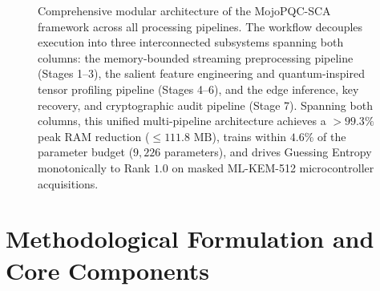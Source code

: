 \documentclass[letterpaper]{article}
\begin{document}
\begin{figure}[t]
\caption{Comprehensive modular architecture of the MojoPQC-SCA framework across all processing pipelines. The workflow decouples execution into three interconnected subsystems spanning both columns: the memory-bounded streaming preprocessing pipeline (Stages 1--3), the salient feature engineering and quantum-inspired tensor profiling pipeline (Stages 4--6), and the edge inference, key recovery, and cryptographic audit pipeline (Stage 7). Spanning both columns, this unified multi-pipeline architecture achieves a $>99.3\%$ peak RAM reduction ($\le 111.8\text{ MB}$), trains within $4.6\%$ of the parameter budget ($9{,}226$ parameters), and drives Guessing Entropy monotonically to Rank $1.0$ on masked ML-KEM-512 microcontroller acquisitions.}
\label{fig:pipeline_arch}
\end{figure}

\section{Methodological Formulation and Core Components}
\end{document}
